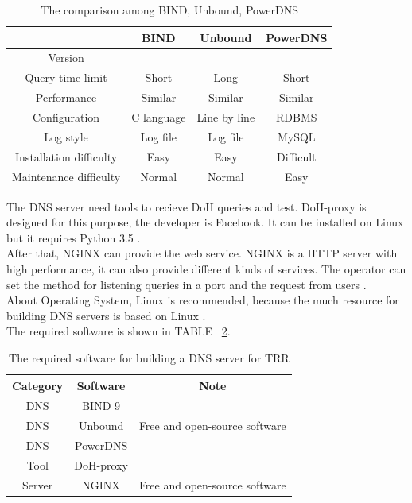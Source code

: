\documentclass[conference]{IEEEtran}
\begin{document}
\begin{table}[hbt!]
    \centering
    \begin{tabular}{|c|c|c|c|}
        \hline
         & BIND & Unbound & PowerDNS \\    
        \hline
         Version &  &  & \\
        \hline
         Query time limit & Short & Long & Short \\
        \hline
         Performance & Similar & Similar & Similar \\
        \hline
         Configuration & C language & Line by line  & RDBMS \\
        \hline
         Log style & Log file & Log file & MySQL \\
        \hline
         Installation difficulty & Easy & Easy & Difficult \\
        \hline
         Maintenance difficulty & Normal & Normal & Easy \\
        \hline
    \end{tabular}
    \caption{The comparison among BIND, Unbound, PowerDNS}
    \label{tab:BIND_unbound_powerDNS}
\end{table}


The DNS server need tools to recieve DoH queries and test. DoH-proxy is designed for this purpose, the developer is Facebook. It can be installed on Linux but it requires Python 3.5 \cite{doh_proxy}.
\\

After that, NGINX can provide the web service. NGINX is a HTTP server with high performance, it can also provide different kinds of services. The operator can set the method for listening queries in a port and the request from users \cite{NGINX_wiki}.
\\

About Operating System, Linux is recommended, because the much resource for building DNS servers is based on Linux \cite{configure_BIND}.
\\

The required software is shown in TABLE ~\ref{tab:required_software}.
\\

\begin{table}[hbt!]
    \centering
    \begin{tabular}{|c|c|c|}
        \hline
         Category & Software & Note\\    
        \hline
         DNS & BIND 9 & \\
        \hline
         DNS & Unbound & Free and open-source software\\
        \hline
         DNS & PowerDNS & \\
        \hline
         Tool & DoH-proxy &  \\
        \hline
        Server & NGINX & Free and open-source software\\
        \hline
    \end{tabular}
    \caption{The required software for building a DNS server for TRR}
    \label{tab:required_software}
\end{table}
\end{document}
